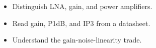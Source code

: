 \begin{objectives}
\begin{itemize}[leftmargin=1.4em,itemsep=2pt]
\item Distinguish LNA, gain, and power amplifiers.
\item Read gain, P1dB, and IP3 from a datasheet.
\item Understand the gain-noise-linearity trade.
\end{itemize}
\end{objectives}
